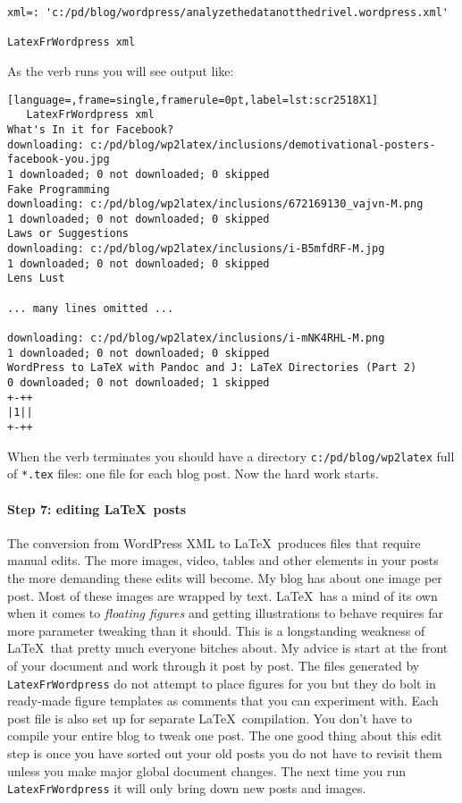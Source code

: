 \footnotesize
\begin{verbatim}
xml=: 'c:/pd/blog/wordpress/analyzethedatanotthedrivel.wordpress.xml'

LatexFrWordpress xml
\end{verbatim}
\normalsize

As the verb runs you will see output like:


\begin{lstlisting}[language=,frame=single,framerule=0pt,label=lst:scr2518X1]
   LatexFrWordpress xml
What's In it for Facebook?
downloading: c:/pd/blog/wp2latex/inclusions/demotivational-posters-facebook-you.jpg
1 downloaded; 0 not downloaded; 0 skipped
Fake Programming
downloading: c:/pd/blog/wp2latex/inclusions/672169130_vajvn-M.png
1 downloaded; 0 not downloaded; 0 skipped
Laws or Suggestions
downloading: c:/pd/blog/wp2latex/inclusions/i-B5mfdRF-M.jpg
1 downloaded; 0 not downloaded; 0 skipped
Lens Lust

... many lines omitted ...

downloading: c:/pd/blog/wp2latex/inclusions/i-mNK4RHL-M.png
1 downloaded; 0 not downloaded; 0 skipped
WordPress to LaTeX with Pandoc and J: LaTeX Directories (Part 2)
0 downloaded; 0 not downloaded; 1 skipped
+-++
|1||
+-++
\end{lstlisting}

When the verb terminates you should have a directory
\texttt{c:/pd/blog/wp2latex} full of \texttt{*.tex} files: one file for
each blog post. Now the hard work starts.

\paragraph{Step 7: editing \LaTeX\ posts}

The conversion from WordPress XML to \LaTeX\ produces files that require
manual edits. The more images, video, tables and other elements in your
posts the more demanding these edits will become. My blog has about one
image per post. Most of these images are wrapped by text. \LaTeX\ has a
mind of its own when it comes to \emph{floating figures} and getting
illustrations to behave requires far more parameter tweaking than it
should. This is a longstanding weakness of \LaTeX\ that pretty much
everyone bitches about. My advice is start at the front of your document
and work through it post by post. The files generated by
\texttt{LatexFrWordpress} do not attempt to place figures for you but
they do bolt in ready-made figure templates as comments that you can
experiment with. Each post file is also set up for separate \LaTeX\
compilation. You don't have to compile your entire blog to tweak one
post. The one good thing about this edit step is once you have sorted
out your old posts you do not have to revisit them unless you make major
global document changes. The next time you run \texttt{LatexFrWordpress}
it will only bring down new posts and images.


